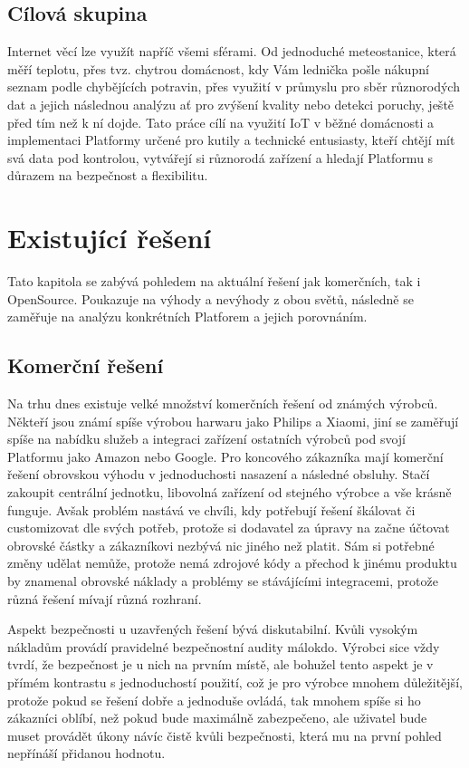 \subsection{Cílová skupina}
Internet věcí lze využít napříč všemi sférami. Od jednoduché meteostanice, která měří teplotu, přes tvz. chytrou domácnost, kdy Vám lednička pošle nákupní seznam podle chybějících potravin, přes využití v průmyslu pro sběr různorodých dat a jejich následnou analýzu ať pro zvýšení kvality nebo detekci poruchy, ještě před tím než k ní dojde. Tato práce cílí na využití IoT v běžné domácnosti a implementaci Platformy určené pro kutily a technické entusiasty, kteří chtějí mít svá data pod kontrolou, vytvářejí si různorodá zařízení a hledají Platformu s důrazem na bezpečnost a flexibilitu.


\section{Existující řešení}
Tato kapitola se zabývá pohledem na aktuální řešení jak komerčních, tak i OpenSource. Poukazuje na výhody a nevýhody z obou světů, následně se zaměřuje na analýzu konkrétních Platforem a jejich porovnáním.

\subsection{Komerční řešení} %
Na trhu dnes existuje velké množství komerčních řešení od známých výrobců. Někteří jsou známí spíše výrobou harwaru jako Philips a Xiaomi, jiní se zaměřují spíše na nabídku služeb a integraci zařízení ostatních výrobců pod svojí Platformu jako Amazon nebo Google. Pro koncového zákazníka mají komerční řešení obrovskou výhodu v jednoduchosti nasazení a následné obsluhy. Stačí zakoupit centrální jednotku, libovolná zařízení od stejného výrobce a vše krásně funguje. Avšak problém nastává ve chvíli, kdy potřebují řešení škálovat či customizovat dle svých potřeb, protože si dodavatel za úpravy na  začne účtovat obrovské částky a zákazníkovi nezbývá nic jiného než platit. Sám si potřebné změny udělat nemůže, protože nemá zdrojové kódy a přechod k jinému produktu by znamenal obrovské náklady a problémy se stávájícími integracemi, protože různá řešení mívají různá rozhraní.

Aspekt bezpečnosti u uzavřených řešení bývá diskutabilní. Kvůli vysokým nákladům provádí pravidelné bezpečnostní audity málokdo. Výrobci sice vždy tvrdí, že bezpečnost je u nich na prvním místě, ale bohužel tento aspekt je v přímém kontrastu s jednoduchostí použití, což je pro výrobce mnohem důležitější, protože pokud se řešení dobře a jednoduše ovládá, tak mnohem spíše si ho zákazníci oblíbí, než pokud bude maximálně zabezpečeno, ale uživatel bude muset provádět úkony návíc čistě kvůli bezpečnosti, která mu na první pohled nepřínáší přidanou hodnotu.

